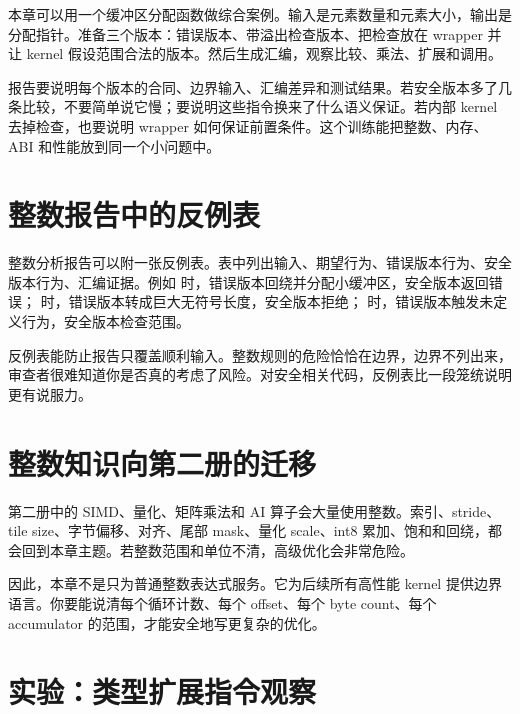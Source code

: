 本章可以用一个缓冲区分配函数做综合案例。输入是元素数量和元素大小，输出是分配指针。准备三个版本：错误版本、带溢出检查版本、把检查放在 wrapper 并让 kernel 假设范围合法的版本。然后生成汇编，观察比较、乘法、扩展和调用。

报告要说明每个版本的合同、边界输入、汇编差异和测试结果。若安全版本多了几条比较，不要简单说它慢；要说明这些指令换来了什么语义保证。若内部 kernel 去掉检查，也要说明 wrapper 如何保证前置条件。这个训练能把整数、内存、ABI 和性能放到同一个小问题中。

\section{整数报告中的反例表}

整数分析报告可以附一张反例表。表中列出输入、期望行为、错误版本行为、安全版本行为、汇编证据。例如  时，错误版本回绕并分配小缓冲区，安全版本返回错误； 时，错误版本转成巨大无符号长度，安全版本拒绝； 时，错误版本触发未定义行为，安全版本检查范围。

反例表能防止报告只覆盖顺利输入。整数规则的危险恰恰在边界，边界不列出来，审查者很难知道你是否真的考虑了风险。对安全相关代码，反例表比一段笼统说明更有说服力。

\section{整数知识向第二册的迁移}

第二册中的 SIMD、量化、矩阵乘法和 AI 算子会大量使用整数。索引、stride、tile size、字节偏移、对齐、尾部 mask、量化 scale、int8 累加、饱和和回绕，都会回到本章主题。若整数范围和单位不清，高级优化会非常危险。

因此，本章不是只为普通整数表达式服务。它为后续所有高性能 kernel 提供边界语言。你要能说清每个循环计数、每个 offset、每个 byte count、每个 accumulator 的范围，才能安全地写更复杂的优化。

\section{实验：类型扩展指令观察}

